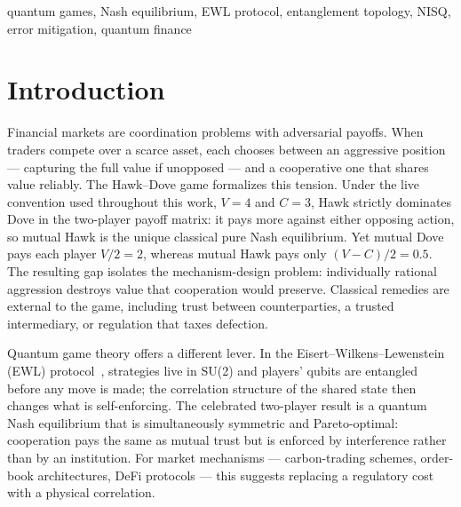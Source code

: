 \documentclass[conference]{IEEEtran}
\begin{document}
\begin{abstract}
mitigated-fold-1 endpoints at $N{=}4$ by $0.0043$ ($2.14\sigma$) and at
$N{=}5$ by $0.0101$ ($5.17\sigma$); these source-run residuals are
retrospective. The same-sign $N{=}5$ deficit recurs in the prospective repeat,
although sign reproduction was not itself a registered test. The
CZ-exponential baseline carries the best score of five registered candidates in
all three executions at $N\le5$, but it misses $N{=}5$ outside the
shared comparison yardstick, and in the registered $N{=}6,7$ extension both it
and the depolarizing model fail their registered tests while the ranking
between them inverts at $N{=}7$; the ranking is not a physical scaling law and
does not extrapolate. The mean-payoff observable
is first-order insensitive to single bit-flips, so the advantage decays several
times slower than state fidelity --- a structural robustness with direct
consequences for quantum market design.
\end{abstract}

\begin{IEEEkeywords}
quantum games, Nash equilibrium, EWL protocol, entanglement topology, NISQ,
error mitigation, quantum finance
\end{IEEEkeywords}

\section{Introduction}\label{sec:intro}

Financial markets are coordination problems with adversarial payoffs. When
traders compete over a scarce asset, each chooses between an aggressive
position --- capturing the full value if unopposed --- and a cooperative one
that shares value reliably. The Hawk--Dove game formalizes this tension. Under
the live convention used throughout this work, $V{=}4$ and $C{=}3$, Hawk
strictly dominates Dove in the two-player payoff matrix: it pays more against
either opposing action, so mutual Hawk is the unique classical pure Nash
equilibrium. Yet mutual Dove pays each player $V/2=2$, whereas mutual Hawk pays
only $(V-C)/2=0.5$. The resulting gap isolates the mechanism-design problem:
individually rational aggression destroys value that cooperation would
preserve. Classical remedies are external to the game, including trust between
counterparties, a trusted intermediary, or regulation that taxes defection.

Quantum game theory offers a different lever. In the
Eisert--Wilkens--Lewenstein (EWL) protocol~\cite{eisert1999}, strategies live
in SU(2) and players' qubits are entangled before any move is made; the
correlation structure of the shared state then changes what is
self-enforcing. The celebrated two-player result is a quantum Nash equilibrium
that is simultaneously symmetric and Pareto-optimal: cooperation pays the same
as mutual trust but is enforced by interference rather than by an
institution. For market mechanisms --- carbon-trading schemes, order-book
architectures, DeFi protocols --- this suggests replacing a regulatory cost
with a physical correlation.
\end{document}
